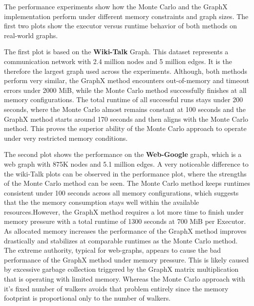 The performance experiments show how the Monte Carlo and the GraphX implementation perform under different memory constraints and graph sizes. The first two plots show the executor versus runtime behavior of both methods on real-world graphs. \par
The first plot is based on the \textbf{Wiki-Talk} Graph. This dataset represents a communication network with 2.4 million nodes and 5 million edges. It is the therefore the largest graph used across the experiments. Although, both methods perform very similar, the GraphX method encounters out-of-memory and timeout errors under 2000 MiB, while the Monte Carlo method successfully finishes at all memory configurations. The total runtime of all successful runs stays under 200 seconds, where the Monte Carlo almost remains constant at 100 seconds and the GraphX method starts around 170 seconds and then aligns with the Monte Carlo method. This proves the superior ability of the Monte Carlo approach to operate under very restricted memory conditions.\par
The second plot shows the performance on the \textbf{Web-Google} graph, which is a web graph with 875K nodes and 5.1 million edges. A very noticeable difference to the wiki-Talk plots can be observed in the performance plot, where the strengths of the Monte Carlo method can be seen. The Monte Carlo method keeps runtimes consistent under 100 seconds across all memory configurations, which suggests that the the memory consumption stays well within the available resources.However, the GraphX method requires a lot more time to finish under memory pressure with a total runtime of 1300 seconds at 700 MiB per Executor. As allocated memory increases the performance of the GraphX method improves drastically and stabilizes at comparable runtimes as the Monte Carlo method. The extreme authority, typical for web-graphs, appears to cause the bad performance of the GraphX method under memory pressure. This is likely caused by excessive garbage collection triggered by the GraphX matrix multiplication that is operating with limited memory. Whereas the Monte Carlo approach with it's fixed number of walkers avoids that problem entirely since the memory footprint is proportional only to the number of walkers. \par




